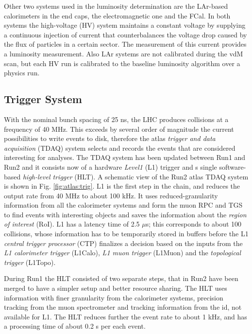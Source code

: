 Other two systems used in the luminosity determination are the LAr-based calorimeters in the end caps, the electromagnetic one and the FCal. In both systems the high-voltage (HV) system maintains a constant voltage by supplying a continuous injection of current that counterbalances the voltage drop caused by the flux of particles in a certain sector. The measurement of this current provides a luminosity measurement. Also LAr systems are not calibrated during the vdM scan, but each HV run is calibrated to the baseline luminosity algorithm over a physics run.  


\subsection{Trigger System}
\label{sec:cern:trigger}

With the nominal bunch spacing of 25 ns, the LHC produces collisions at a frequency of 40 MHz. This exceeds by several order of magnitude the current possibilities to write events to disk, therefore the \gls{atlas} \textit{trigger and data acquisition} (TDAQ) system selects and records the events that are considered interesting for analyses. The TDAQ system has been updated between Run1 and Run2 \cite{Aaboud:2016leb} and it consists now of a  hardware \textit{Level1} (L1) trigger and s single software-based \textit{high-level trigger} (HLT). A schematic view of the Run2 \gls{atlas} TDAQ system is shown in Fig. \ref{fig:atlas:trig}. L1 is the first step in the chain, and reduces the output rate from 40 MHz to about 100 kHz. It uses reduced-granularity information from all the calorimeter systems and form the muon RPC and TGS to find events with interesting objects and saves the information about the \textit{region of interest} (RoI). L1 has a latency time of 2.5 $\mu$s; this corresponds to about 100 collisions, whose information has to be temporarily stored in buffers before the L1 \textit{central trigger processor} (CTP) finalizes a decision based on the inputs from the \textit{L1 calorimeter trigger} (L1Calo), \textit{L1 muon trigger} (L1Muon) and the \textit{topological trigger} (L1Topo). 

During Run1 the HLT consisted of two separate steps, that in Run2 have been merged to have a simpler setup and better resource sharing. The HLT uses information with finer granularity from the calorimeter systems, precision tracking from the muon spectrometer and tracking information from the \gls{id}, not available for L1. The HLT reduces further the event rate to about 1 kHz, and has a processing time of about 0.2 s per each event. 

